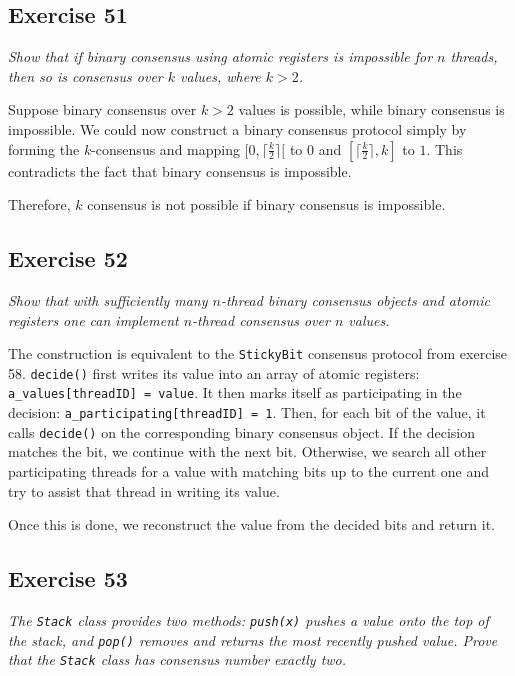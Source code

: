 \documentclass[a4paper,10pt]{article}
\begin{document}
\subsection{Exercise 51}

\emph{Show that if binary consensus using atomic registers is impossible for
$n$ threads, then so is consensus over $k$ values, where $k > 2$.}

\vspace{3mm}

Suppose binary consensus over $k > 2$ values is possible, while binary consensus
is impossible. We could now construct a binary consensus protocol simply by forming
the $k$-consensus and mapping $[0, \lceil \frac{k}{2} \rceil[$ to $0$ and
$[\lceil \frac{k}{2} \rceil, k]$ to $1$. This contradicts the fact that binary consensus is impossible.

Therefore, $k$ consensus is not possible if binary consensus is impossible.

\subsection{Exercise 52}

\emph{Show that with sufficiently many $n$-thread binary consensus objects
and atomic registers one can implement $n$-thread consensus over $n$ values.}

The construction is equivalent to the \lstinline|StickyBit| consensus protocol from
exercise 58. \lstinline|decide()| first writes its value into an array of atomic registers: \lstinline|a_values[threadID] = value|. It then marks itself as participating in the decision: \lstinline|a_participating[threadID] = 1|. Then, for each bit of the value, it calls \lstinline|decide()| on
the corresponding binary consensus object. If the decision matches the bit, we continue with the next bit.
Otherwise, we search all other participating threads for a value with matching bits up to the current one
and try to assist that thread in writing its value.

Once this is done, we reconstruct the value from the decided bits and return it.

\subsection{Exercise 53}

\emph{The \lstinline|Stack| class provides two methods: \lstinline|push(x)| pushes a value onto the top of the stack, and \lstinline|pop()| removes and returns the most recently pushed value. Prove that the \lstinline|Stack| class has consensus number exactly two.}
\end{document}
